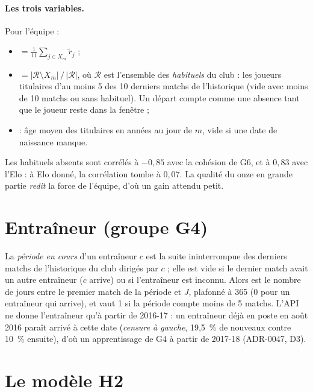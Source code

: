 \paragraph{Les trois variables.} Pour l'équipe :
\begin{itemize}
  \item {} \(= \frac{1}{11}\sum_{j \in X_m} \tilde r_j\) ;
  \item {} \(= |\mathcal{R} \setminus X_m| \,/\, |\mathcal{R}|\), où
        \(\mathcal{R}\) est l'ensemble des \emph{habituels} du club : les joueurs titulaires d'au moins 5 des
        10 derniers matchs de l'historique (vide avec moins de 10 matchs ou sans habituel). Un départ compte
        comme une absence tant que le joueur reste dans la fenêtre ;
  \item {} : âge moyen des titulaires en années au jour de \(m\), vide si une date de
        naissance manque.
\end{itemize}
Les habituels absents sont corrélés à \(-0{,}85\) avec la cohésion de G6, et  à \(0{,}83\) avec
l'Elo : à Elo donné, la corrélation tombe à \(0{,}07\). La qualité du onze en grande partie \emph{redit} la
force de l'équipe, d'où un gain attendu petit.

\section{Entraîneur (groupe G4)}
\label{sec:g4}

La \emph{période en cours} d'un entraîneur \(c\) est la suite ininterrompue des derniers matchs de
l'historique du club dirigés par \(c\) ; elle est vide si le dernier match avait un autre entraîneur (\(c\)
arrive) ou si l'entraîneur est inconnu. Alors  est le nombre de jours entre le premier
match de la période et \(J\), plafonné à 365 (0 pour un entraîneur qui arrive), et 
vaut 1 si la période compte moins de 5 matchs. L'API ne donne l'entraîneur qu'à partir de 2016-17 : un
entraîneur déjà en poste en août 2016 paraît arrivé à cette date (\emph{censure à gauche}, 19,5~\% de \og
nouveaux \fg{} contre 10~\% ensuite), d'où un apprentissage de G4 à partir de 2017-18 (ADR-0047, D3).

\section{Le modèle H2}
\label{sec:modele-h2}

